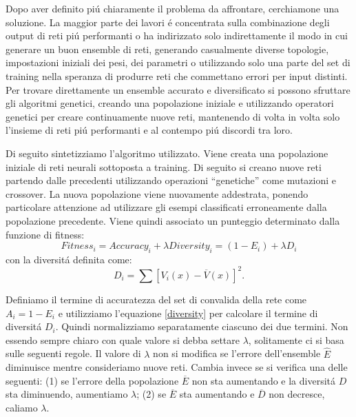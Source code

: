 \documentclass[a4paper,12pt]{report}
\begin{document}
  Dopo aver definito pi\'u chiaramente il problema da affrontare, cerchiamone una soluzione. 
  La maggior parte dei lavori \'e concentrata sulla combinazione degli output di reti pi\'u performanti o ha indirizzato solo indirettamente il modo in cui generare un buon ensemble di reti, generando casualmente diverse topologie, impostazioni iniziali dei pesi, dei parametri o utilizzando solo una parte del set di training nella speranza di produrre reti che commettano errori per input distinti. 
  Per trovare direttamente un ensemble accurato e diversificato si possono sfruttare gli algoritmi genetici, creando una popolazione iniziale e utilizzando operatori genetici per creare continuamente nuove reti, mantenendo di volta in volta solo l'insieme di reti pi\'u performanti e al contempo pi\'u discordi tra loro. 

  
  Di seguito sintetizziamo l'algoritmo utilizzato. 
  Viene creata una popolazione iniziale di reti neurali sottoposta a training. 
  Di seguito si creano nuove reti partendo dalle precedenti utilizzando operazioni ``genetiche'' come mutazioni e crossover. 
  La nuova popolazione viene nuovamente addestrata, ponendo particolare attenzione ad utilizzare gli esempi classificati erroneamente dalla popolazione precedente. 
  Viene quindi associato un punteggio determinato dalla funzione di fitness:
  \begin{equation}
   Fitness_i = Accuracy_i + \lambda Diversity_i = (1-E_i) + \lambda D_i \label{fitness}
  \end{equation}
  con la diversit\'a definita come:
  \begin{equation}
   D_i = \sum \left[ V_i \left(x\right) - \overline{V} \left(x\right) \right]^2. \label{diversity}
  \end{equation}
  
  Definiamo il termine di accuratezza del set di convalida della rete come $A_i = 1-E_i$ e utilizziamo l'equazione \ref{diversity} per calcolare il termine di diversit\'a $D_i$. 
  Quindi normalizziamo separatamente ciascuno dei due termini. Non essendo sempre chiaro con quale valore si debba settare $\lambda$, solitamente ci si basa sulle seguenti regole. 
  Il valore di $\lambda$ non si modifica se l'errore dell'ensemble $\widehat{E}$ diminuisce mentre consideriamo nuove reti. 
  Cambia invece se si verifica una delle seguenti: (1) se l'errore della popolazione $\overline{E}$ non sta aumentando e la diversit\'a $D$ sta diminuendo, aumentiamo $\lambda$; (2) se $\overline{E}$ sta aumentando e $\overline{D}$ non decresce, caliamo $\lambda$.
  
\end{document}
